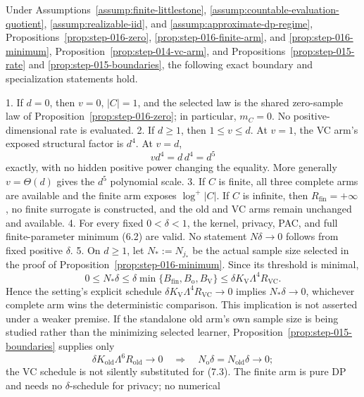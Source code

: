\begin{proposition}\label{prop:step-016-frontier}
Under Assumptions~\ref{assump:finite-littlestone},
\ref{assump:countable-evaluation-quotient},
\ref{assump:realizable-iid}, and
\ref{assump:approximate-dp-regime},
Propositions~\ref{prop:step-016-zero},
\ref{prop:step-016-finite-arm}, and
\ref{prop:step-016-minimum}, Proposition~\ref{prop:step-014-vc-arm}, and 
Propositions~\ref{prop:step-015-rate} and
\ref{prop:step-015-boundaries}, the following exact boundary and
specialization statements hold.

1. If \(d=0\), then \(v=0\), \(|C|=1\), and the selected law is the shared
   zero-sample law of Proposition~\ref{prop:step-016-zero}; in particular,
   \(m_C=0\). No positive-dimensional rate is evaluated.
2. If \(d\ge1\), then \(1\le v\le d\). At \(v=1\), the VC arm's exposed
   structural factor is \(d^4\). At \(v=d\),
   \[
   vd^4=d\,d^4=d^5
   \tag{7.1}
   \]
   exactly, with no hidden positive power changing the equality. More
   generally \(v=\Theta(d)\) gives the \(d^5\) polynomial scale.
3. If \(C\) is finite, all three complete arms are available and the finite
   arm exposes \(\log^+|C|\). If \(C\) is infinite, then
   \(R_{\mathrm{fin}}=+\infty\), no finite surrogate is constructed, and the
   old and VC arms remain unchanged and available.
4. For every fixed \(0<\delta<1\), the kernel, privacy, PAC, and full
   finite-parameter minimum (6.2) are valid. No statement
   \(N\delta\to0\) follows from fixed positive \(\delta\).
5. On \(d\ge1\), let \(N_*:=N_{j_*}\) be the actual sample size selected in
   the proof of Proposition~\ref{prop:step-016-minimum}. Since its threshold
   is minimal,
   \[
   0\le N_*\delta
   \le\delta\min\{B_{\mathrm{fin}},B_{\mathrm o},B_{\mathrm V}\}
   \le\delta K_{\mathrm V}\Lambda^4R_{\mathrm{VC}}.
   \tag{7.2}
   \]
   Hence the setting's explicit schedule
   \(\delta K_{\mathrm V}\Lambda^4R_{\mathrm{VC}}\to0\) implies
   \(N_*\delta\to0\), whichever complete arm wins the deterministic
   comparison. This implication is not asserted under a weaker premise.
   If the standalone old arm's own sample size is being studied rather than
   the minimizing selected learner, Proposition~\ref{prop:step-015-boundaries} supplies only
   \[
   \delta K_{\mathrm{old}}\Lambda^6R_{\mathrm{old}}\to0
   \quad\Longrightarrow\quad
   N_{\mathrm o}\delta=N_{\mathrm{old}}\delta\to0;
   \tag{7.3}
   \]
   the VC schedule is not silently substituted for (7.3). The finite arm is
   pure DP and needs no \(\delta\)-schedule for privacy; no numerical

\end{proposition}
